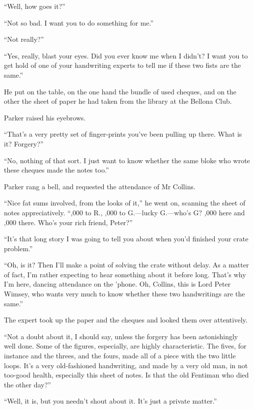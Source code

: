 \enquote{Well, how goes it?}

\enquote{Not so bad. I want you to do something for me.}

\enquote{Not really?}

\enquote{Yes, really, blast your eyes. Did you ever know me when I didn't? I want you to get hold of one of your handwriting experts to tell me if these two fists are the same.}

He put on the table, on the one hand the bundle of used cheques, and on the other the sheet of paper he had taken from the library at the Bellona Club.

Parker raised his eyebrows.

\enquote{That's a very pretty set of finger-prints you've been pulling up there. What is it? Forgery?}

\enquote{No, nothing of that sort. I just want to know whether the same bloke who wrote these cheques made the notes too.}

Parker rang a bell, and requested the attendance of Mr Collins.

\enquote{Nice fat sums involved, from the looks of it,} he went on, scanning the sheet of notes appreciatively. \enquote{,000 to R., ,000 to G.---lucky G.---who's G? ,000 here and ,000 there. Who's your rich friend, Peter?}

\enquote{It's that long story I was going to tell you about when you'd finished your crate problem.}

\enquote{Oh, is it? Then I'll make a point of solving the crate without delay. As a matter of fact, I'm rather expecting to hear something about it before long. That's why I'm here, dancing attendance on the 'phone. Oh, Collins, this is Lord Peter Wimsey, who wants very much to know whether these two handwritings are the same.}

The expert took up the paper and the cheques and looked them over attentively.

\enquote{Not a doubt about it, I should say, unless the forgery has been astonishingly well done. Some of the figures, especially, are highly characteristic. The fives, for instance and the threes, and the fours, made all of a piece with the two little loops. It's a very old-fashioned handwriting, and made by a very old man, in not too-good health, especially this sheet of notes. Is that the old Fentiman who died the other day?}

\enquote{Well, it is, but you needn't shout about it. It's just a private matter.}

